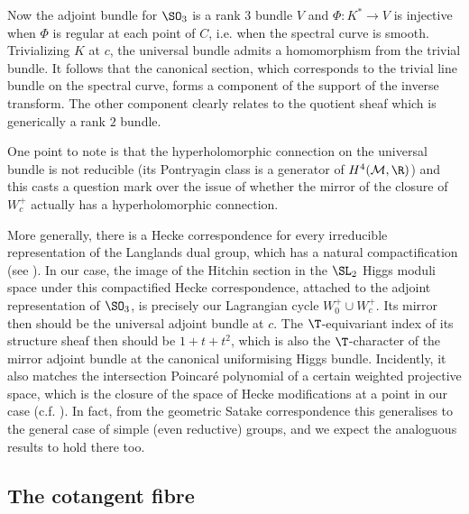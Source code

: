 Now the  adjoint bundle for $\SO_3$ is a rank $3$ bundle $V$ and $\Phi: K^*\rightarrow V$  is injective when $\Phi$ is regular at
each point of $C$, i.e. when the spectral curve is smooth. Trivializing $K$
at $c$, the universal bundle admits a homomorphism from the trivial bundle. It follows that the canonical section, which corresponds to the trivial line bundle on the spectral curve,  forms a component of the
support of the inverse transform. The other component clearly relates to the quotient sheaf which is generically a rank $2$ bundle.

One point to note is that the hyperholomorphic connection on the universal bundle is not  reducible (its Pontryagin class is a generator of $H^4({\mathcal M},\R)$) and this casts a question mark over the
issue of whether the mirror of the closure of $W^+_c$ actually has a hyperholomorphic connection.

More generally, there is a Hecke correspondence for every irreducible representation of the Langlands dual group, which has a natural compactification (see \cite[\S 9]{kapustin-witten}).  In our case, the image of the Hitchin section in the $\SL_2$ Higgs moduli space under this compactified Hecke  correspondence, attached to the adjoint representation of $\SO_3$, is precisely our Lagrangian cycle $W_0^+\cup W_c^+$. Its mirror then should be the universal adjoint bundle at $c$. The $\T$-equivariant index of its structure sheaf then should be $1+t+t^2$, which is also the $\T$-character of the mirror adjoint bundle at the canonical uniformising Higgs bundle. Incidently, it also matches the intersection Poincar\'e polynomial of a certain weighted projective space, which is the closure of the space of Hecke modifications at a point in our case (c.f. \cite[9.2]{kapustin-witten}). In fact, from the geometric Satake correspondence \cite{mirkovic-villonen,ginzburg} this generalises to the general case of simple (even reductive) groups, and we expect the analoguous results to hold there too.

\subsection{The cotangent fibre} \label{cotfib}

